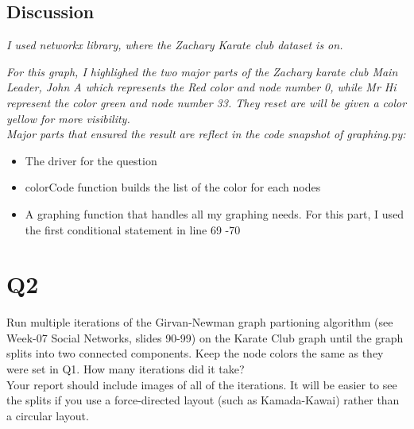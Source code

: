 \documentclass[12pt]{article}
\begin{document}
\subsection*{Discussion}
\emph{I used networkx library, where the Zachary Karate club dataset is on.}

\emph{
For this graph, I highlighed the two major parts of the Zachary karate club Main Leader, John A which represents the Red color and node number 0, while Mr Hi represent the color green and node number 33. They reset are will be given a color yellow for more visibility.\\
Major parts that ensured the result are reflect in the code snapshot of graphing.py:}
    \begin{itemize}
        \item The driver for the question 
        \item colorCode function builds the list of the color for each nodes 
        
        \item A graphing function that handles all my graphing needs. For this part, I used the first conditional statement in line 69 -70
         
    \end{itemize}

\section*{Q2}
Run multiple iterations of the Girvan-Newman graph partioning algorithm (see Week-07 Social Networks, slides 90-99) on the Karate Club graph until the graph splits into two connected components. Keep the node colors the same as they were set in Q1. How many iterations did it take? \\ 
Your report should include images of all of the iterations. It will be easier to see the splits if you use a force-directed layout (such as Kamada-Kawai) rather than a circular layout. \\ \\ \\
\end{document}
